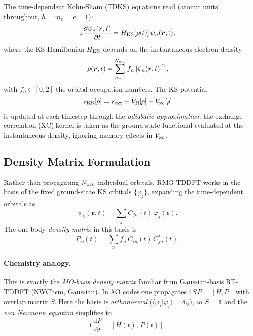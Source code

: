 \documentclass[12pt,letterpaper]{article}
\newcommand{\braket}[2]{\langle #1 \vert #2 \rangle}
\newcommand{\comm}[2]{\left[ #1,\, #2 \right]}
\newcommand{\dd}{\mathrm{d}}
\newcommand{\ii}{\mathrm{i}}
\newcommand{\Hks}{H_{\rm KS}}
\begin{document}
The time-dependent Kohn-Sham (TDKS) equations read (atomic units throughout,
$\hbar = m_e = e = 1$):
\begin{equation}
  \ii\,\frac{\partial \psi_n(\bm{r},t)}{\partial t}
  = \Hks[\rho(t)]\,\psi_n(\bm{r},t),
  \label{eq:tdks}
\end{equation}
where the KS Hamiltonian $\Hks$ depends on the instantaneous electron density
\begin{equation}
  \rho(\bm{r},t) = \sum_{n=1}^{N_{\rm occ}} f_n \left|\psi_n(\bm{r},t)\right|^2,
  \label{eq:density}
\end{equation}
with $f_n \in [0,2]$ the orbital occupation numbers.  The KS potential
\begin{equation}
  V_{\rm KS}[\rho] = V_{\rm ext} + V_{\rm H}[\rho] + V_{\rm xc}[\rho]
\end{equation}
is updated at each timestep through the \emph{adiabatic approximation}: the
exchange-correlation (XC) kernel is taken as the ground-state functional
evaluated at the instantaneous density, ignoring memory effects in $V_{\rm xc}$.

\subsection{Density Matrix Formulation}
\label{sec:densmat}

Rather than propagating $N_{\rm occ}$ individual orbitals, RMG-TDDFT works in
the basis of the fixed ground-state KS orbitals $\{\varphi_j\}$, expanding the
time-dependent orbitals as
\begin{equation}
  \psi_n(\bm{r},t) = \sum_j C_{jn}(t)\,\varphi_j(\bm{r}).
  \label{eq:expand}
\end{equation}
The one-body \emph{density matrix} in this basis is
\begin{equation}
  P_{ij}(t) = \sum_n f_n\,C_{in}(t)\,C_{jn}^*(t).
  \label{eq:densmat}
\end{equation}

\paragraph{Chemistry analogy.}
This is exactly the \emph{MO-basis density matrix} familiar from Gaussian-basis
RT-TDDFT (NWChem, Gaussian).  In AO codes one propagates
$\ii\,S\,\dot{P} = [H,P]$ with overlap matrix $S$.  Here the basis is
\emph{orthonormal} ($\braket{\varphi_i}{\varphi_j}=\delta_{ij}$), so $S=\mathbb{1}$
and the \emph{von Neumann equation} simplifies to
\begin{equation}
  \ii\,\frac{\dd P}{\dd t} = \comm{H(t)}{P(t)}.
  \label{eq:vonneumann}
\end{equation}
\end{document}
